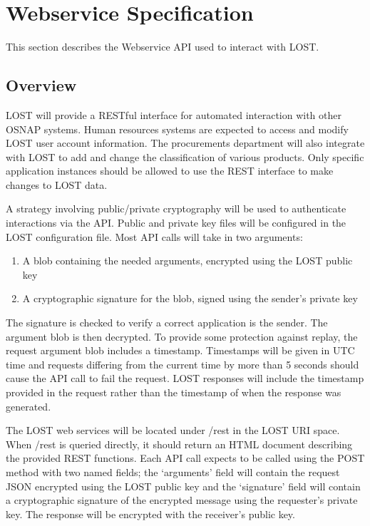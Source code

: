 \chapter*{Webservice Specification}
This section describes the Webservice API used to interact with LOST.

\section*{Overview}
LOST will provide a RESTful interface for automated interaction with other OSNAP systems. Human resources systems are expected to access and modify LOST user account information. The procurements department will also integrate with LOST to add and change the classification of various products. Only specific application instances should be allowed to use the REST interface to make changes to LOST data.

A strategy involving public/private cryptography will be used to authenticate interactions via the API. Public and private key files will be configured in the LOST configuration file. Most API calls will take in two arguments:
\begin{enumerate}
\item A blob containing the needed arguments, encrypted using the LOST public key
\item A cryptographic signature for the blob, signed using the sender's private key
\end{enumerate}
The signature is checked to verify a correct application is the sender. The argument blob is then decrypted. To provide some protection against replay, the request argument blob includes a timestamp. Timestamps will be given in UTC time and requests differing from the current time by more than 5 seconds should cause the API call to fail the request. LOST responses will include the timestamp provided in the request rather than the timestamp of when the response was generated.

The LOST web services will be located under /rest in the LOST URI space. When /rest is queried directly, it should return an HTML document describing the provided REST functions. Each API call expects to be called using the POST method with two named fields; the `arguments' field will contain the request JSON encrypted using the LOST public key and the `signature' field will contain a cryptographic signature of the encrypted message using the requester's private key. The response will be encrypted with the receiver's public key.

